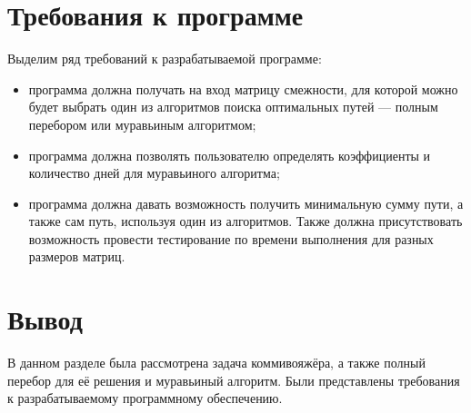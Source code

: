 \section{Требования к программе}
Выделим ряд требований к разрабатываемой программе:
\begin{itemize}[label=---]
	\item программа должна получать на вход матрицу смежности, для которой можно будет выбрать один из алгоритмов поиска оптимальных путей --- полным перебором или муравьиным алгоритмом;
	\item программа должна позволять пользователю определять коэффициенты и количество дней для муравьиного алгоритма;
	\item программа должна давать возможность получить минимальную сумму пути, а также сам путь, используя один из алгоритмов. Также должна присутствовать возможность провести тестирование по времени выполнения для разных размеров матриц.
\end{itemize}

\section*{Вывод}

В данном разделе была рассмотрена задача коммивояжёра, а также полный перебор для её решения и муравьиный алгоритм. Были представлены требования к разрабатываемому программному обеспечению.
